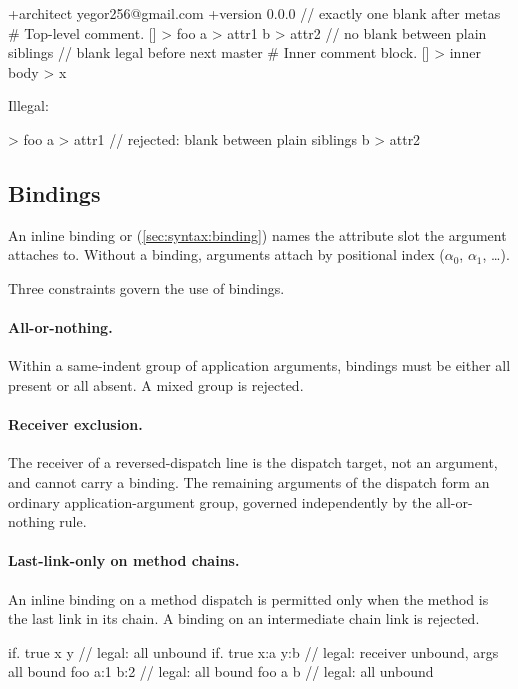 \begin{ffcode}
+architect yegor256@gmail.com
+version 0.0.0
                              // exactly one blank after metas
# Top-level comment.
[] > foo
  a > attr1
  b > attr2                   // no blank between plain siblings
                              // blank legal before next master
  # Inner comment block.
  [] > inner
    body > x
\end{ffcode}

Illegal:
\begin{ffcode}
[] > foo
  a > attr1
                              // rejected: blank between plain siblings
  b > attr2
\end{ffcode}

\subsection{Bindings}\label{sec:wf:bindings}

An inline binding  or  (\cref{sec:syntax:binding}) names
  the attribute slot the argument attaches to.
Without a binding, arguments attach by positional index (\(\alpha_0\),
  \(\alpha_1\), \ldots).

Three constraints govern the use of bindings.

\paragraph{All-or-nothing.}
Within a same-indent group of application arguments, bindings must be
  either all present or all absent.
A mixed group is rejected.

\paragraph{Receiver exclusion.}
The receiver of a reversed-dispatch line is the dispatch target, not an
  argument, and cannot carry a binding.
The remaining arguments of the dispatch form an ordinary application-argument
  group, governed independently by the all-or-nothing rule.

\paragraph{Last-link-only on method chains.}
An inline binding on a method dispatch is permitted only when the method
  is the last link in its chain.
A binding on an intermediate chain link is rejected.

\begin{ffcode}
if. true x y               // legal: all unbound
if. true x:a y:b           // legal: receiver unbound, args all bound
foo a:1 b:2                // legal: all bound
foo a b                    // legal: all unbound
\end{ffcode}

